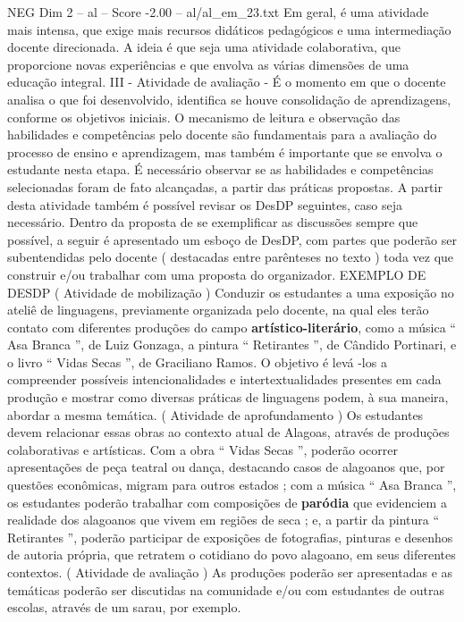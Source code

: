 \begin{textsample}{NEG Dim 2 – al – Score -2.00 – al/al\_em\_23.txt}
Em geral, é uma atividade mais intensa, que exige mais recursos didáticos pedagógicos e uma intermediação docente direcionada.
A ideia é que seja uma atividade colaborativa, que proporcione novas experiências e que envolva as várias dimensões de uma educação integral.
III - Atividade de avaliação - É o momento em que o docente analisa o que foi desenvolvido, identifica se houve consolidação de aprendizagens, conforme os objetivos iniciais.
O mecanismo de leitura e observação das habilidades e competências pelo docente são fundamentais para a avaliação do processo de ensino e aprendizagem, mas também é importante que se envolva o estudante nesta etapa.
É necessário observar se as habilidades e competências selecionadas foram de fato alcançadas, a partir das práticas propostas.
A partir desta atividade também é possível revisar os DesDP seguintes, caso seja necessário.
Dentro da proposta de se exemplificar as discussões sempre que possível, a seguir é apresentado um esboço de DesDP, com partes que poderão ser subentendidas pelo docente ( destacadas entre parênteses no texto ) toda vez que construir e/ou trabalhar com uma proposta do organizador.
EXEMPLO DE DESDP ( Atividade de mobilização ) Conduzir os estudantes a uma exposição no ateliê de linguagens, previamente organizada pelo docente, na qual eles terão contato com diferentes produções do campo \textbf{artístico-literário}, como a música “ Asa Branca ”, de Luiz Gonzaga, a pintura “ Retirantes ”, de Cândido Portinari, e o livro “ Vidas Secas ”, de Graciliano Ramos.
O objetivo é levá -los a compreender possíveis intencionalidades e intertextualidades presentes em cada produção e mostrar como diversas práticas de linguagens podem, à sua maneira, abordar a mesma temática. ( Atividade de aprofundamento ) Os estudantes devem relacionar essas obras ao contexto atual de Alagoas, através de produções colaborativas e artísticas.
Com a obra “ Vidas Secas ”, poderão ocorrer apresentações de peça teatral ou dança, destacando casos de alagoanos que, por questões econômicas, migram para outros estados ; com a música “ Asa Branca ”, os estudantes poderão trabalhar com composições de \textbf{paródia} que evidenciem a realidade dos alagoanos que vivem em regiões de seca ; e, a partir da pintura “ Retirantes ”, poderão participar de exposições de fotografias, pinturas e desenhos de autoria própria, que retratem o cotidiano do povo alagoano, em seus diferentes contextos. ( Atividade de avaliação ) As produções poderão ser apresentadas e as temáticas poderão ser discutidas na comunidade e/ou com estudantes de outras escolas, através de um sarau, por exemplo.

\end{textsample}
